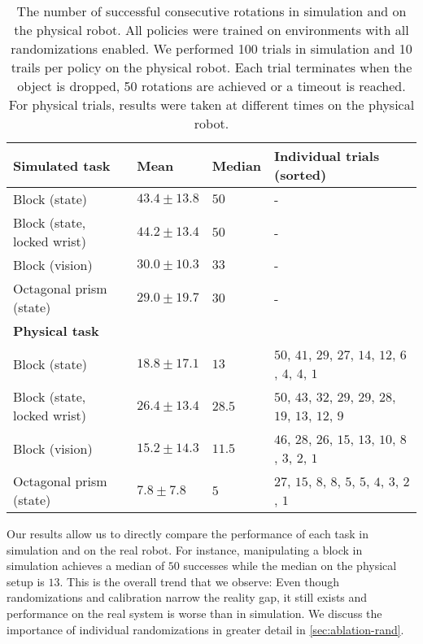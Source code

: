 \begin{table}[h]
    \centering
    \renewcommand{\arraystretch}{1.1}
    \caption{The number of successful consecutive rotations in simulation and on the physical robot. All policies were trained on environments with all randomizations enabled. We performed 100 trials in simulation and 10 trails per policy on the physical robot. Each trial terminates when the object is dropped, 50 rotations are achieved or a timeout is reached. For physical trials, results were taken at different times on the physical robot.}
    \begin{tabular}{@{}llll@{}}
        \toprule
        \textbf{Simulated task} & \textbf{Mean} & \textbf{Median} & \textbf{Individual trials (sorted)} \\ 
        \midrule
        Block (state) & $43.4 \pm 13.8$ & $50$ & - \\
        Block (state, locked wrist) & $44.2 \pm 13.4$ & $50$ & - \\
        Block (vision) & $30.0 \pm 10.3$ & $33$ & - \\
        Octagonal prism (state) & $29.0 \pm 19.7$ & $30$ & - \\
        \midrule
        \textbf{Physical task} \\
        \midrule
        
        
        Block (state) & $18.8 \pm 17.1$  & $13$ & $50$, $41$, $29$, $27$, $14$, $12$, $6$, $4$, $4$, $1$ \\
        
        Block (state, locked wrist) & $26.4 \pm 13.4$ & $28.5$ & $50$, $43$, $32$, $29$, $29$, $28$, $19$, $13$, $12$, $9$ \\
        
        Block (vision) & $15.2 \pm 14.3$ & $11.5$ & $46$, $28$, $26$, $15$, $13$, $10$, $8$, $3$, $2$, $1$ \\
        Octagonal prism (state) & $7.8 \pm 7.8$ & $5$ & $27$, $15$, $8$, $8$, $5$, $5$, $4$, $3$, $2$, $1$ \\
        \bottomrule
    \end{tabular}
    \label{table:perf}
\end{table}

        
        
        
        


Our results allow us to directly compare the performance of each task in simulation and on the real robot.
For instance, manipulating a block in simulation achieves a median of $50$ successes while the median on the physical setup is $13$.
This is the overall trend that we observe: Even though randomizations and calibration narrow the reality gap, it still exists and performance on the real system is worse than in simulation. We discuss the importance of individual randomizations in greater detail in \autoref{sec:ablation-rand}.

